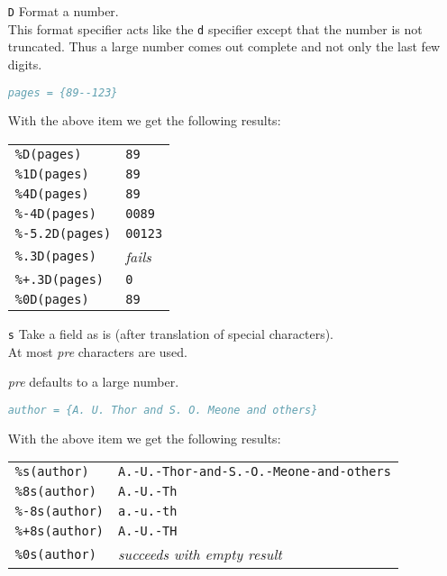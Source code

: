 \documentclass[11pt,a4paper]{scrbook}
\begin{document}
\begin{itemize}
  \item [\texttt{D}] Format a number.\\
    This format specifier acts like the \texttt{d} specifier except that the
    number is not truncated. Thus a large number comes out complete and not
    only the last few digits.

    \begin{Example}
      \begin{lstlisting}[language=BibTeX]
  pages = {89--123}
      \end{lstlisting}\vspace{-2ex}
      With the above item we get the following results:
      
      \begin{tabular}{ll}
        \texttt{\%D(pages)}		& \texttt{89}		\\
        \texttt{\%1D(pages)}	& \texttt{89}		\\
        \texttt{\%4D(pages)}	& \texttt{89}		\\
        \texttt{\%-4D(pages)}	& \texttt{0089}		\\
        \texttt{\%-5.2D(pages)}	& \texttt{00123}	\\
        \texttt{\%.3D(pages)}	& \textit{fails}	\\
        \texttt{\%+.3D(pages)}	& \texttt{0}		\\
        \texttt{\%0D(pages)}	& \texttt{89}
      \end{tabular}
    \end{Example}

  \item [\texttt{s}] Take a field as is (after translation of
    special characters).\\ 
    At most \textit{pre} characters are used.

    \textit{pre} defaults to a large number.

    \begin{Example}
      \begin{lstlisting}[language=BibTeX]
  author = {A. U. Thor and S. O. Meone and others}
      \end{lstlisting}\vspace{-2ex}
      With the above item we get the following results:
      
      \begin{tabular}{ll}
        \texttt{\%s(author)}	& \texttt{A.-U.-Thor-and-S.-O.-Meone-and-others}	\\
        \texttt{\%8s(author)}	& \texttt{A.-U.-Th}	\\
        \texttt{\%-8s(author)}	& \texttt{a.-u.-th}	\\
        \texttt{\%+8s(author)}	& \texttt{A.-U.-TH}	\\
        \texttt{\%0s(author)}	& \textit{succeeds with empty result}
      \end{tabular}
    \end{Example}


\end{itemize}
\end{document}
